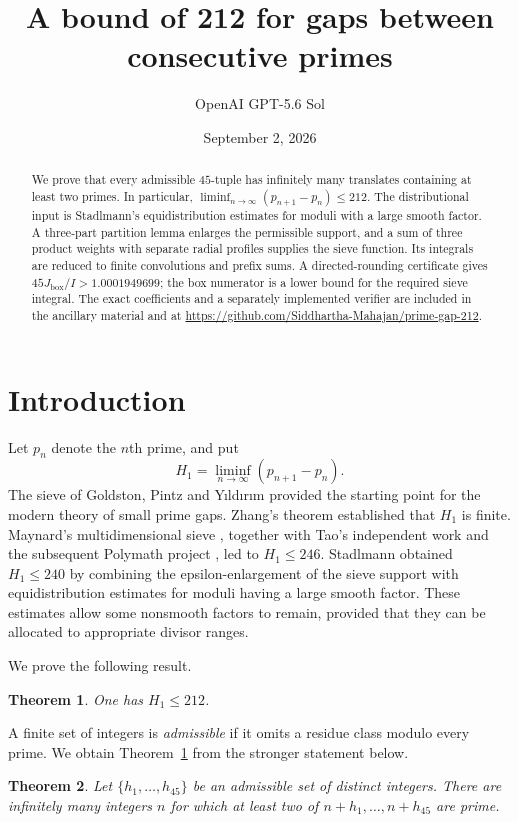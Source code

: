 \documentclass[11pt,reqno]{amsart}
\title[A bound of 212 for prime gaps]{A bound of 212 for gaps between consecutive primes}
\author{OpenAI GPT-5.6 Sol}
\date{September 2, 2026}
\newtheorem{theorem}{Theorem}[section]
\theoremstyle{definition}
\theoremstyle{remark}
\numberwithin{equation}{section}
\begin{document}
\begin{abstract}
We prove that every admissible $45$-tuple has infinitely many translates
containing at least two primes. In particular,
$\liminf_{n\to\infty}(p_{n+1}-p_n)\le 212$.
The distributional input is Stadlmann's equidistribution estimates for
moduli with a large smooth factor. A three-part partition lemma enlarges
the permissible support, and a sum of three product weights with separate
radial profiles supplies the sieve function. Its integrals are reduced to
finite convolutions and prefix sums. A directed-rounding certificate gives
$45J_{\mathrm{box}}/I>1.0001949699$; the box numerator is a lower bound for
the required sieve integral. The exact coefficients and a separately
implemented verifier are included in the ancillary material and at
\url{https://github.com/Siddhartha-Mahajan/prime-gap-212}.
\end{abstract}
\maketitle

\section{Introduction}
Let $p_n$ denote the $n$th prime, and put
\[
 H_1=\liminf_{n\to\infty}(p_{n+1}-p_n).
\]
The sieve of Goldston, Pintz and Y{\i}ld{\i}r{\i}m \cite{GPY} provided the
starting point for the modern theory of small prime gaps. Zhang's
theorem \cite{Zhang} established that $H_1$ is finite. Maynard's
multidimensional sieve \cite{Maynard}, together with Tao's independent
work and the subsequent Polymath project \cite{PolymathSieve}, led to
$H_1\le246$. Stadlmann \cite{Stadlmann26} obtained $H_1\le240$ by combining
the epsilon-enlargement of the sieve support with equidistribution
estimates for moduli having a large smooth factor. These estimates allow
some nonsmooth factors to remain, provided that they can be allocated to
appropriate divisor ranges.

We prove the following result.
\begin{theorem}\label{thm:main}
One has $H_1\le212$.
\end{theorem}
A finite set of integers is \emph{admissible} if it omits a residue class
modulo every prime. We obtain Theorem~\ref{thm:main} from the stronger
statement below.
\begin{theorem}\label{thm:tuples}
Let $\{h_1,\ldots,h_{45}\}$ be an admissible set of distinct integers.
There are infinitely many integers $n$ for which at least two of
$n+h_1,\ldots,n+h_{45}$ are prime.
\end{theorem}
\end{document}
